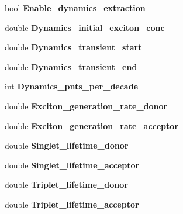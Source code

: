 \begin{DoxyCompactItemize}
bool {\bfseries Enable\+\_\+dynamics\+\_\+extraction}
\item 
\mbox{\label{struct_parameters___o_p_v_a23e65440f36e8f28070c2392b01dd6b6}} 
double {\bfseries Dynamics\+\_\+initial\+\_\+exciton\+\_\+conc}
\item 
\mbox{\label{struct_parameters___o_p_v_a7cbc42f3e445821afb335f249b9dd680}} 
double {\bfseries Dynamics\+\_\+transient\+\_\+start}
\item 
\mbox{\label{struct_parameters___o_p_v_a7964f93d211ecaa30c0b6b3e7397003d}} 
double {\bfseries Dynamics\+\_\+transient\+\_\+end}
\item 
\mbox{\label{struct_parameters___o_p_v_a2506d3838ff71aac4853d7708f3ef74c}} 
int {\bfseries Dynamics\+\_\+pnts\+\_\+per\+\_\+decade}
\item 
\mbox{\label{struct_parameters___o_p_v_a4ceac22ea3ecbe7a6edab19e80d0783c}} 
double {\bfseries Exciton\+\_\+generation\+\_\+rate\+\_\+donor}
\item 
\mbox{\label{struct_parameters___o_p_v_a33f99679368b91dcc39f305a658d793b}} 
double {\bfseries Exciton\+\_\+generation\+\_\+rate\+\_\+acceptor}
\item 
\mbox{\label{struct_parameters___o_p_v_a4d772923d973c80fbd4b8fe18fec9f16}} 
double {\bfseries Singlet\+\_\+lifetime\+\_\+donor}
\item 
\mbox{\label{struct_parameters___o_p_v_ab8ebcc4989f4b0fd5bfcd0ae59fb3ee6}} 
double {\bfseries Singlet\+\_\+lifetime\+\_\+acceptor}
\item 
\mbox{\label{struct_parameters___o_p_v_acb3f6fce76263baa95b6a20c7aeb5c4b}} 
double {\bfseries Triplet\+\_\+lifetime\+\_\+donor}
\item 
\mbox{\label{struct_parameters___o_p_v_a4149a095d01c62295865a9064fccb637}} 
double {\bfseries Triplet\+\_\+lifetime\+\_\+acceptor}
\item 

\end{DoxyCompactItemize}
